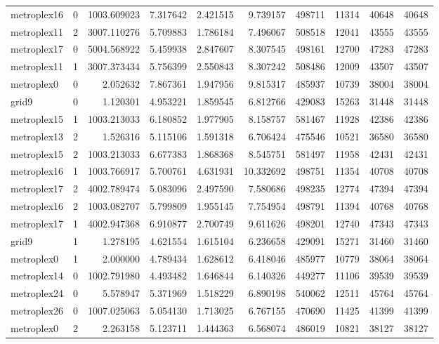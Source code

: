 \begin{longtable}{|l|r|r|r|r|r|r|r|r|r|}
metroplex16 & 0 & 1003.609023 & 7.317642 & 2.421515 & 9.739157 & 498711 & 11314 & 40648 & 40648 \\
metroplex11 & 2 & 3007.110276 & 5.709883 & 1.786184 & 7.496067 & 508518 & 12041 & 43555 & 43555 \\
metroplex17 & 0 & 5004.568922 & 5.459938 & 2.847607 & 8.307545 & 498161 & 12700 & 47283 & 47283 \\
metroplex11 & 1 & 3007.373434 & 5.756399 & 2.550843 & 8.307242 & 508486 & 12009 & 43507 & 43507 \\
metroplex0 & 0 & 2.052632 & 7.867361 & 1.947956 & 9.815317 & 485937 & 10739 & 38004 & 38004 \\
grid9 & 0 & 1.120301 & 4.953221 & 1.859545 & 6.812766 & 429083 & 15263 & 31448 & 31448 \\
metroplex15 & 1 & 1003.213033 & 6.180852 & 1.977905 & 8.158757 & 581467 & 11928 & 42386 & 42386 \\
metroplex13 & 2 & 1.526316 & 5.115106 & 1.591318 & 6.706424 & 475546 & 10521 & 36580 & 36580 \\
metroplex15 & 2 & 1003.213033 & 6.677383 & 1.868368 & 8.545751 & 581497 & 11958 & 42431 & 42431 \\
metroplex16 & 1 & 1003.766917 & 5.700761 & 4.631931 & 10.332692 & 498751 & 11354 & 40708 & 40708 \\
metroplex17 & 2 & 4002.789474 & 5.083096 & 2.497590 & 7.580686 & 498235 & 12774 & 47394 & 47394 \\
metroplex16 & 2 & 1003.082707 & 5.799809 & 1.955145 & 7.754954 & 498791 & 11394 & 40768 & 40768 \\
metroplex17 & 1 & 4002.947368 & 6.910877 & 2.700749 & 9.611626 & 498201 & 12740 & 47343 & 47343 \\
grid9 & 1 & 1.278195 & 4.621554 & 1.615104 & 6.236658 & 429091 & 15271 & 31460 & 31460 \\
metroplex0 & 1 & 2.000000 & 4.789434 & 1.628612 & 6.418046 & 485977 & 10779 & 38064 & 38064 \\
metroplex14 & 0 & 1002.791980 & 4.493482 & 1.646844 & 6.140326 & 449277 & 11106 & 39539 & 39539 \\
metroplex24 & 0 & 5.578947 & 5.371969 & 1.518229 & 6.890198 & 540062 & 12511 & 45764 & 45764 \\
metroplex26 & 0 & 1007.025063 & 5.054130 & 1.713025 & 6.767155 & 470690 & 11425 & 41399 & 41399 \\
metroplex0 & 2 & 2.263158 & 5.123711 & 1.444363 & 6.568074 & 486019 & 10821 & 38127 & 38127 \\

\end{longtable}
